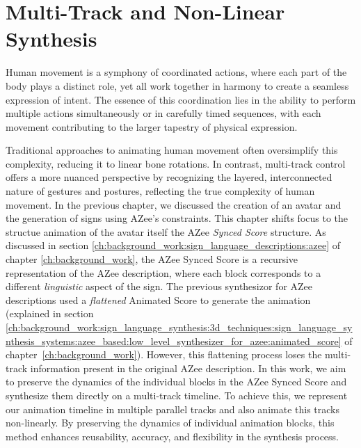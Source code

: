 \documentclass[../../main.tex]{subfiles}
\begin{document}
\chapter{Multi-Track and Non-Linear Synthesis}
\label{ch:multi_track}

Human movement is a symphony of coordinated actions, where each part of the body plays a distinct role, yet all work together in harmony to create a seamless expression of intent. The essence of this coordination lies in the ability to perform multiple actions simultaneously or in carefully timed sequences, with each movement contributing to the larger tapestry of physical expression.

Traditional approaches to animating human movement often oversimplify this complexity, reducing it to linear bone rotations. In contrast, multi-track control offers a more nuanced perspective by recognizing the layered, interconnected nature of gestures and postures, reflecting the true complexity of human movement. In the previous chapter, we discussed the creation of an avatar and the generation of signs using AZee's constraints. This chapter shifts focus to the structue animation of the avatar itself the AZee \emph{Synced Score} structure. As discussed in section \ref{ch:background_work:sign_language_descriptions:azee} of chapter \ref{ch:background_work}, the AZee Synced Score is a recursive representation of the AZee description, where each block corresponds to a different \emph{linguistic} aspect of the sign. The previous synthesizor for AZee descriptions used a \emph{flattened} Animated Score to generate the animation (explained in section \ref{ch:background_work:sign_language_synthesis:3d_techniques:sign_language_synthesis_systems:azee_based:low_level_synthesizer_for_azee:animated_score} of chapter~\ref{ch:background_work}). However, this flattening process loses the multi-track information present in the original AZee description. In this work, we aim to preserve the dynamics of the individual blocks in the AZee Synced Score and synthesize them directly on a multi-track timeline. To achieve this, we represent our animation timeline in multiple parallel tracks and also animate this tracks non-linearly. By preserving the dynamics of individual animation blocks, this method enhances reusability, accuracy, and flexibility in the synthesis process.
\end{document}
